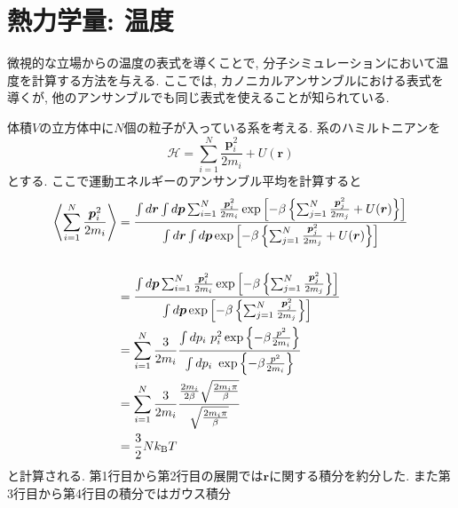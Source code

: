 \section{熱力学量: 温度}
微視的な立場からの温度の表式を導くことで, 分子シミュレーションにおいて温度を計算する方法を与える.
ここでは, カノニカルアンサンブルにおける表式を導くが, 他のアンサンブルでも同じ表式を使えることが知られている. 

体積$V$の立方体中に$N$個の粒子が入っている系を考える.
系のハミルトニアンを
\begin{equation}
 \mathcal{H} = \sum_{i=1}^{N}\frac{\bm{p}_{i}^{2}}{2m_{i}} + U(\bm{r})
\end{equation}
とする.
ここで運動エネルギーのアンサンブル平均を計算すると
\begin{align}
  \left\langle \sum_{i=1}^{N}\frac{\bm{p}_{i}^{2}}{2 m_{i}} \right\rangle
&=\frac {
          \int d\bm{r} \int d\bm{p} \sum_{i=1}^{N} \frac{\bm{p}_{i}^{2}}{2 m_{i}}
          \exp \left[
                     -\beta \left\{\sum_{j=1}^{N} \frac{\bm{p}_{j}^{2}}{2m_{j}} + U (\bm{r}) \right\}
               \right]
         }
         {
           \int d\bm{r} \int d\bm{p}
           \exp \left[
                      -\beta \left\{\sum_{j=1}^{N} \frac{\bm{p}_{j}^{2}}{2m_{j}} + U (\bm{r}) \right\}
                \right]
         }
  \notag
  \\
  \notag
  \\
&=\frac {
          \int d\bm{p} \sum_{i=1}^{N} \frac{\bm{p}_{i}^{2}}{2 m_{i}}
          \exp \left[
                     -\beta \left\{\sum_{j=1}^{N} \frac{\bm{p}_{j}^{2}}{2m_{j}} \right\}
               \right]
         }
         {
           \int d\bm{p}
           \exp \left[
                      -\beta \left\{\sum_{j=1}^{N} \frac{\bm{p}_{j}^{2}}{2m_{j}} \right\}
                \right]
         }
  \notag
  \\
&=\sum_{i=1}^{N} \frac{3}{2 m_{i}}
  \frac {
          \int d p_{i}~ p_{i}^{2} \exp \left\{-\beta \frac{p^{2}}{2m_{i}} \right\}
        }
        {
          \int d p_{i}~ \exp \left\{-\beta \frac{p^{2}}{2m_{i}} \right\}
        }
  \notag
  \\
&=\sum_{i=1}^{N} \frac{3}{2 m_{i}}
  \frac {
          \frac{2m_{i}}{2\beta} \sqrt{\frac{2m_{i}\pi}{\beta}}
        }
        {
          \sqrt{\frac{2m_{i}\pi}{\beta}}
        }
  \notag
  \\
&=\frac{3}{2} N k_{\mathrm{B}} T
  \notag
\end{align}
と計算される.
第1行目から第2行目の展開では$\bm{r}$に関する積分を約分した.
また第3行目から第4行目の積分ではガウス積分
